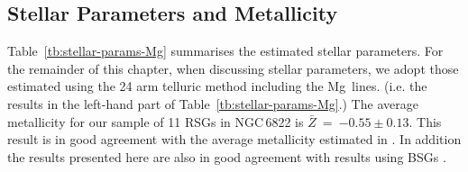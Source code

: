 \begin{table}
\begin{center}
\begin{tabular}{lc cccc c cccc}


  \hline
  \end{tabular}
  \end{center}
\end{table}



\subsection{Stellar Parameters and Metallicity} %
\label{sub:stellar_parameters_and_metallicity}

Table~\ref{tb:stellar-params-Mg} summarises the estimated stellar parameters.
For the remainder of this chapter, when discussing stellar parameters,
we adopt those estimated using the 24 arm telluric method including the Mg\,\1 lines.
(i.e. the results in the left-hand part of Table~\ref{tb:stellar-params-Mg}.)
The average metallicity for our sample of 11 RSGs in NGC\,6822 is
$\bar{Z}$~=~$-0.55\pm0.13$.
This result is in good agreement with the average metallicity estimated in
\citet[][see also Figure~\ref{fig:ZvsR}]{2015ApJ...803...14P}.
In addition the results presented here are also in good agreement with results using BSGs
\citep[BSGs;][]{1999A&A...352L..40M,2001ApJ...547..765V}.

